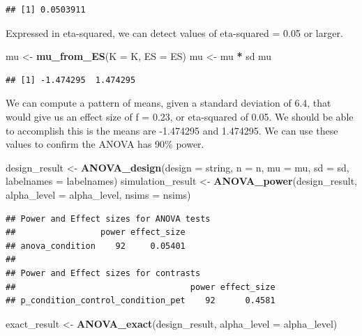\documentclass[]{book}
\newenvironment{Shaded}{\begin{snugshade}}{\end{snugshade}}
\newcommand{\DataTypeTok}[1]{\textcolor[rgb]{0.13,0.29,0.53}{#1}}
\newcommand{\KeywordTok}[1]{\textcolor[rgb]{0.13,0.29,0.53}{\textbf{#1}}}
\newcommand{\NormalTok}[1]{#1}
\newcommand{\OperatorTok}[1]{\textcolor[rgb]{0.81,0.36,0.00}{\textbf{#1}}}
\newcommand{\StringTok}[1]{\textcolor[rgb]{0.31,0.60,0.02}{#1}}
\begin{document}
\begin{verbatim}
## [1] 0.0503911
\end{verbatim}

Expressed in eta-squared, we can detect values of eta-squared = 0.05 or larger.

\begin{Shaded}
\begin{Highlighting}[]
\NormalTok{mu <-}\StringTok{ }\KeywordTok{mu_from_ES}\NormalTok{(}\DataTypeTok{K =}\NormalTok{ K, }\DataTypeTok{ES =}\NormalTok{ ES)}
\NormalTok{mu <-}\StringTok{ }\NormalTok{mu }\OperatorTok{*}\StringTok{ }\NormalTok{sd}
\NormalTok{mu}
\end{Highlighting}
\end{Shaded}

\begin{verbatim}
## [1] -1.474295  1.474295
\end{verbatim}

We can compute a pattern of means, given a standard deviation of 6.4, that would give us an effect size of f = 0.23, or eta-squared of 0.05. We should be able to accomplish this is the means are -1.474295 and 1.474295. We can use these values to confirm the ANOVA has 90\% power.

\begin{Shaded}
\begin{Highlighting}[]
\NormalTok{design_result <-}\StringTok{ }\KeywordTok{ANOVA_design}\NormalTok{(}\DataTypeTok{design =}\NormalTok{ string,}
                   \DataTypeTok{n =}\NormalTok{ n, }
                   \DataTypeTok{mu =}\NormalTok{ mu, }
                   \DataTypeTok{sd =}\NormalTok{ sd, }
                   \DataTypeTok{labelnames =}\NormalTok{ labelnames)}
\NormalTok{simulation_result <-}\StringTok{ }\KeywordTok{ANOVA_power}\NormalTok{(design_result, }\DataTypeTok{alpha_level =}\NormalTok{ alpha_level, }\DataTypeTok{nsims =}\NormalTok{ nsims)}
\end{Highlighting}
\end{Shaded}

\begin{verbatim}
## Power and Effect sizes for ANOVA tests
##                 power effect_size
## anova_condition    92     0.05401
## 
## Power and Effect sizes for contrasts
##                                   power effect_size
## p_condition_control_condition_pet    92      0.4581
\end{verbatim}

\begin{Shaded}
\begin{Highlighting}[]
\NormalTok{exact_result <-}\StringTok{ }\KeywordTok{ANOVA_exact}\NormalTok{(design_result, }\DataTypeTok{alpha_level =}\NormalTok{ alpha_level)}
\end{Highlighting}
\end{Shaded}
\end{document}
